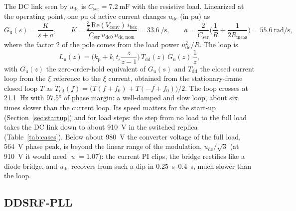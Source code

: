 \documentclass[11pt,a4paper]{scrartcl}
\newcommand{\ped}[1]{_{\mathrm{#1}}}
\begin{document}
\begin{onehalfspace}
The DC link seen by $u\ped{dc}$ is $C\ped{ser} = \SI{7.2}{\milli\farad}$ with the resistive load. Linearized at the operating point, one pu of active current changes $u\ped{dc}$ (in pu) as
\begin{equation}
	G\ped{u}(s) = \frac{K}{s + a}, \qquad K = \frac{\tfrac32\, \mathrm{Re}(V\ped{conv})\, i\ped{bez}}{C\ped{ser}\, u\ped{dc0}\, u\ped{dc,nom}} = \SI{33.6}{\per\second}, \qquad a = \frac{2}{C\ped{ser}}\Big(\frac{1}{R} + \frac{1}{2R\ped{meas}}\Big) = \SI{55.6}{\radian\per\second},
\end{equation}
where the factor 2 of the pole comes from the load power $u\ped{dc}^2/R$. The loop is
\begin{equation}
	L\ped{u}(z) = \Big(k\ped{p} + k\ped{i}\, t\ped{s} \frac{z}{z-1}\Big)\, T\ped{dd}(z)\, G\ped{u}(z)\, \frac{1}{z},
	\label{eq:ludc}
\end{equation}
with $G\ped{u}(z)$ the zero-order-hold equivalent of $G\ped{u}(s)$ and $T\ped{dd}$ the closed current loop from the $\xi$ reference to the $\xi$ current, obtained from the stationary-frame closed loop $T$ as $T\ped{dd}(f) = \big(T(f + f\ped{0}) + \overline{T(-f + f\ped{0})}\big)/2$. The loop crosses at \SI{21.1}{\hertz} with \ang{97.5} of phase margin: a well-damped and slow loop, about six times slower than the current loop. Its speed matters for the start-up (Section~\ref{sec:startup}) and for load steps: the step from no load to the full load takes the DC link down to about \SI{910}{\volt} in the switched replica (Table~\ref{tab:cases}). Below about \SI{980}{\volt} the converter voltage of the full load, \SI{564}{\volt} phase peak, is beyond the linear range of the modulation, $u\ped{dc}/\sqrt3$ (at \SI{910}{\volt} it would need $|u| = \num{1.07}$): the current PI clips, the bridge rectifies like a diode bridge, and $u\ped{dc}$ recovers from such a dip in \SIrange{0.25}{0.4}{\second}, much slower than the loop.

\subsection{DDSRF-PLL}
\label{sec:pll}


\end{onehalfspace}
\end{document}
